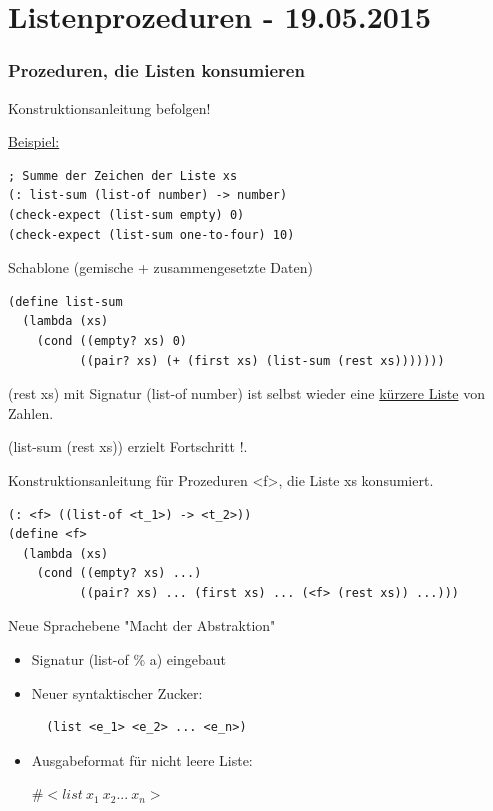 \documentclass[a4paper, 20pt, openany]{book}
\begin{document}
\chapter{Listenprozeduren - 19.05.2015}
\subsection*{Prozeduren, die Listen konsumieren}

Konstruktionsanleitung befolgen!

\underline{Beispiel:}

\begin{lstlisting}
; Summe der Zeichen der Liste xs
(: list-sum (list-of number) -> number) 
(check-expect (list-sum empty) 0) 
(check-expect (list-sum one-to-four) 10) 

\end{lstlisting}

Schablone (gemische + zusammengesetzte Daten)

\begin{lstlisting}
(define list-sum
  (lambda (xs)
    (cond ((empty? xs) 0)
          ((pair? xs) (+ (first xs) (list-sum (rest xs)))))))
\end{lstlisting}

(rest xs) mit Signatur (list-of number) ist selbst wieder eine \underline{kürzere Liste} von Zahlen. 

(list-sum (rest xs)) erzielt Fortschritt !.

Konstruktionsanleitung für Prozeduren <f>, die Liste xs konsumiert.

\begin{lstlisting}
(: <f> ((list-of <t_1>) -> <t_2>))
(define <f>
  (lambda (xs)
    (cond ((empty? xs) ...)
          ((pair? xs) ... (first xs) ... (<f> (rest xs)) ...)))
\end{lstlisting}


Neue Sprachebene "Macht der Abstraktion"

\begin{itemize}
  \item Signatur (list-of \% a) eingebaut
  \item Neuer syntaktischer Zucker:
  
  \begin{lstlisting}
  (list <e_1> <e_2> ... <e_n>)
  \end{lstlisting}
  
  \item Ausgabeformat für nicht leere Liste:
  
  \#$<list \ x_1 \ x_2 ... \ x_n >$
\end{itemize}
\end{document}
